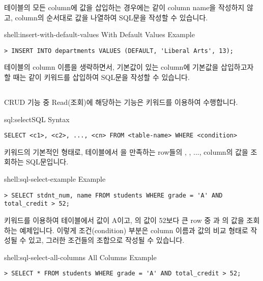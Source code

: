 테이블의 모든 column에 값을 삽입하는 경우에는 \와 같이 column name을 작성하지 않고, column의 순서대로 값을 나열하여 SQL문을 작성할 수 있습니다.

\begin{shellenv}{shell:insert-with-default-values}{ With Default Values Example}\begin{verbatim}
> INSERT INTO departments VALUES (DEFAULT, 'Liberal Arts', 13);
\end{verbatim}
\end{shellenv}

테이블의 column 이름을 생략하면서, 기본값이 있는 column에 기본값을 삽입하고자 할 때는 \와 같이  키워드를 삽입하여 SQL문을 작성할 수 있습니다.

\subsection*{}

CRUD 기능 중 Read(조회)에 해당하는 기능은  키워드를 이용하여 수행합니다.

\begin{sqlenv}{sql:select}{SQL  Syntax}\begin{verbatim}
SELECT <c1>, <c2>, ..., <cn> FROM <table-name> WHERE <condition>
\end{verbatim}
\end{sqlenv}

\는  키워드의 기본적인 형태로,  테이블에서 을 만족하는 row들의 , , ...,  column의 값을 조회하는 SQL문입니다.

\begin{shellenv}{shell:sql-select-example}{ Example}\begin{verbatim}
> SELECT stdnt_num, name FROM students WHERE grade = 'A' AND total_credit > 52;
\end{verbatim}
\end{shellenv}

\은  키워드를 이용하여  테이블에서  값이 A이고, 의 값이 52보다 큰 row 중 과 의 값을 조회하는 예제입니다. 이렇게 조건(condition) 부분은 column 이름과 값의 비교 형태로 작성될 수 있고, 그러한 조건들의 조합으로 작성될 수 있습니다.

\begin{shellenv}{shell:sql-select-all-columns}{ All Columns Example}\begin{verbatim}
> SELECT * FROM students WHERE grade = 'A' AND total_credit > 52;
\end{verbatim}
\end{shellenv}

